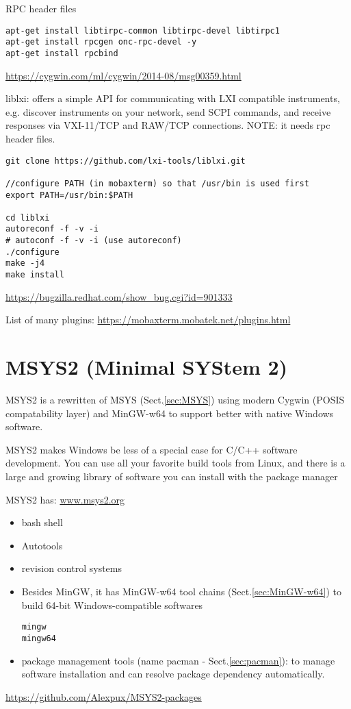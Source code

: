 RPC header files
\begin{verbatim}
apt-get install libtirpc-common libtirpc-devel libtirpc1
apt-get install rpcgen onc-rpc-devel -y
apt-get install rpcbind
\end{verbatim}
\url{https://cygwin.com/ml/cygwin/2014-08/msg00359.html}

liblxi: offers a simple API for communicating with LXI compatible instruments, 
e.g.  discover instruments on your network, send SCPI commands, and receive
responses via VXI-11/TCP and RAW/TCP connections.
NOTE: it needs rpc header files. 
\label{sec:liblxi}
\begin{verbatim}
git clone https://github.com/lxi-tools/liblxi.git

//configure PATH (in mobaxterm) so that /usr/bin is used first
export PATH=/usr/bin:$PATH

cd liblxi
autoreconf -f -v -i
# autoconf -f -v -i (use autoreconf)
./configure
make -j4
make install
\end{verbatim}


\url{https://bugzilla.redhat.com/show_bug.cgi?id=901333}

List of many plugins:
\url{https://mobaxterm.mobatek.net/plugins.html}


\section{MSYS2 (Minimal SYStem 2)}
\label{sec:MSYS2}

MSYS2 is a rewritten of MSYS (Sect.\ref{sec:MSYS}) using modern Cygwin (POSIS
compatability layer) and MinGW-w64 to support better with native Windows
software.

MSYS2 makes Windows be less of a special case for C/C++ software development.
You can use all your favorite build tools from Linux, and there is a large and
growing library of software you can install with the package manager

MSYS2 has: \url{www.msys2.org}

\begin{itemize}
  \item bash shell
  
  \item Autotools
  
  \item revision control systems
  
  \item Besides MinGW, it has MinGW-w64 tool chains (Sect.\ref{sec:MinGW-w64})
  to build 64-bit Windows-compatible softwares

\begin{verbatim}
mingw
mingw64
\end{verbatim}  
  
  \item package management tools (name pacman - Sect.\ref{sec:pacman}): to
  manage software installation and can resolve package dependency automatically.
  
\end{itemize}
\url{https://github.com/Alexpux/MSYS2-packages}

